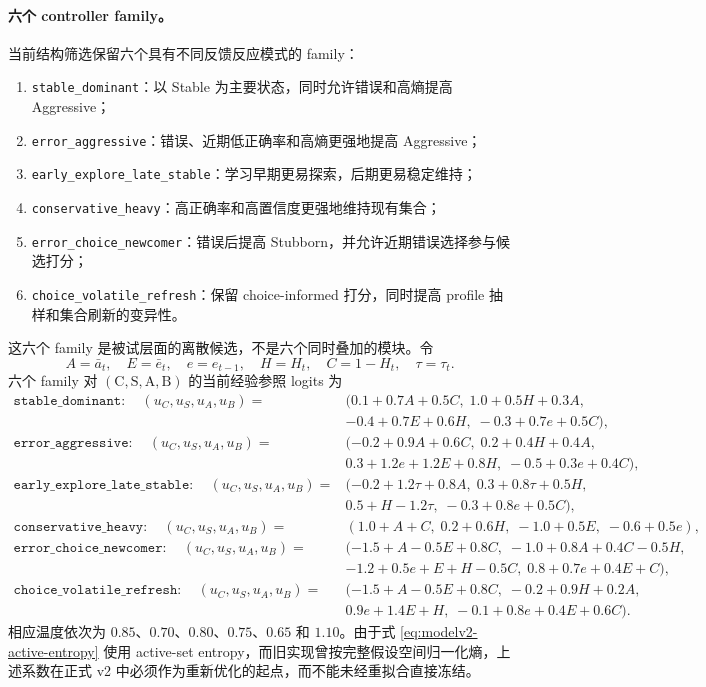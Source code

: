 \paragraph{六个 controller family。}
当前结构筛选保留六个具有不同反馈反应模式的 family：
\begin{enumerate}
    \item \texttt{stable\_dominant}：以 Stable 为主要状态，同时允许错误和高熵提高 Aggressive；
    \item \texttt{error\_aggressive}：错误、近期低正确率和高熵更强地提高 Aggressive；
    \item \texttt{early\_explore\_late\_stable}：学习早期更易探索，后期更易稳定维持；
    \item \texttt{conservative\_heavy}：高正确率和高置信度更强地维持现有集合；
    \item \texttt{error\_choice\_newcomer}：错误后提高 Stubborn，并允许近期错误选择参与候选打分；
    \item \texttt{choice\_volatile\_refresh}：保留 choice-informed 打分，同时提高 profile 抽样和集合刷新的变异性。
\end{enumerate}
这六个 family 是被试层面的离散候选，不是六个同时叠加的模块。令
\[
    A=\bar a_t,\quad E=\bar e_t,\quad
    e=e_{t-1},\quad H=H_t,\quad
    C=1-H_t,\quad \tau=\tau_t .
\]
六个 family 对 $(\mathrm C,\mathrm S,\mathrm A,\mathrm B)$ 的当前经验参照 logits 为
\begin{align}
    \texttt{stable\_dominant}:\quad
    (u_C,u_S,u_A,u_B)
    ={}&
    (0.1+0.7A+0.5C,\;
     1.0+0.5H+0.3A,\nonumber\\
    &-0.4+0.7E+0.6H,\;
     -0.3+0.7e+0.5C),\\
    \texttt{error\_aggressive}:\quad
    (u_C,u_S,u_A,u_B)
    ={}&
    (-0.2+0.9A+0.6C,\;
     0.2+0.4H+0.4A,\nonumber\\
    &0.3+1.2e+1.2E+0.8H,\;
     -0.5+0.3e+0.4C),\\
    \texttt{early\_explore\_late\_stable}:\quad
    (u_C,u_S,u_A,u_B)
    ={}&
    (-0.2+1.2\tau+0.8A,\;
     0.3+0.8\tau+0.5H,\nonumber\\
    &0.5+H-1.2\tau,\;
     -0.3+0.8e+0.5C),\\
    \texttt{conservative\_heavy}:\quad
    (u_C,u_S,u_A,u_B)
    ={}&
    (1.0+A+C,\;
     0.2+0.6H,\;
     -1.0+0.5E,\;
     -0.6+0.5e),\\
    \texttt{error\_choice\_newcomer}:\quad
    (u_C,u_S,u_A,u_B)
    ={}&
    (-1.5+A-0.5E+0.8C,\;
     -1.0+0.8A+0.4C-0.5H,\nonumber\\
    &-1.2+0.5e+E+H-0.5C,\;
     0.8+0.7e+0.4E+C),\\
    \texttt{choice\_volatile\_refresh}:\quad
    (u_C,u_S,u_A,u_B)
    ={}&
    (-1.5+A-0.5E+0.8C,\;
     -0.2+0.9H+0.2A,\nonumber\\
    &0.9e+1.4E+H,\;
     -0.1+0.8e+0.4E+0.6C).
    \label{eq:modelv2-controller-family-logits}
\end{align}
相应温度依次为 $0.85$、$0.70$、$0.80$、$0.75$、$0.65$ 和 $1.10$。由于式 \ref{eq:modelv2-active-entropy} 使用 active-set entropy，而旧实现曾按完整假设空间归一化熵，上述系数在正式 v2 中必须作为重新优化的起点，而不能未经重拟合直接冻结。


